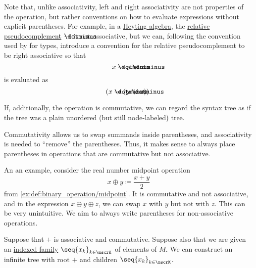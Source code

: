 \begin{remark}
\begin{thmenum}
    Note that, unlike associativity, left and right associativity are not properties of the operation, but rather conventions on how to evaluate expressions without explicit parentheses. For example, in a \hyperref[def:heyting_algebra]{Heyting algebra}, the \hyperref[def:heyting_algebra]{relative pseudocomplement} \( \synimplies \) is not associative, but we can, following the convention used by  for types, introduce a convention for the relative pseudocomplement to be right associative so that
    \begin{equation*}
      x \synimplies y \synimplies z
    \end{equation*}
    is evaluated as
    \begin{equation*}
      (x \synimplies (y \synimplies z)).
    \end{equation*}

     If, additionally, the operation is \hyperref[def:binary_operation/commutative]{commutative}, we can regard the syntax tree as if the tree was a plain unordered (but still node-labeled) tree.

    Commutativity allows us to swap summands inside parentheses, and associativity is needed to \enquote{remove} the parentheses. Thus, it makes sense to always place parentheses in operations that are commutative but not associative.

    An an example, consider the real number midpoint operation
    \begin{equation*}
      x \oplus y \coloneqq \frac {x + y} 2
    \end{equation*}
    from \cref{ex:def:binary_operation/midpoint}. It is commutative and not associative, and in the expression \( x \oplus y \oplus z \), we can swap \( x \) with \( y \) but not with \( z \). This can be very unintuitive. We aim to always write parentheses for non-associative operations.

     Suppose that \( + \) is associative and commutative. Suppose also that we are given an \hyperref[def:indexed_family]{indexed family} \( \seq{ x_k }_{k \in \mscrK} \) of elements of \( M \). We can construct an infinite tree with root \( + \) and children \( \seq{ x_k }_{k \in \mscrK} \).


\end{thmenum}
\end{remark}
